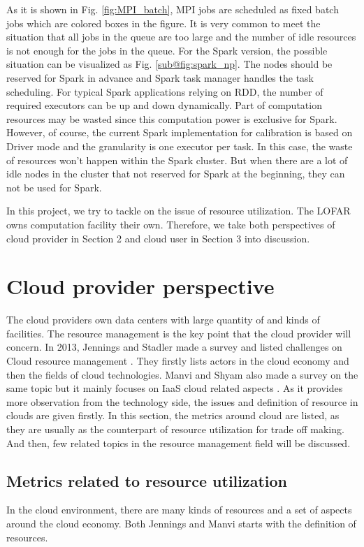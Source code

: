 \documentclass[sigchi]{acmart}
\begin{document}
As it is shown in Fig. \ref{fig:MPI_batch}, MPI jobs are scheduled as fixed batch jobs which are colored boxes in the figure. It is very common to meet the situation that all jobs in the queue are too large and the number of idle resources is not enough for the jobs in the queue. 
For the Spark version, the possible situation can be visualized as Fig. \ref{sub@fig:spark_np}. The nodes should be reserved for Spark in advance and Spark task manager handles the task scheduling. For typical Spark applications relying on RDD, the number of required executors can be up and down dynamically. Part of computation resources may be wasted since this computation power is exclusive for Spark.
However, of course, the current Spark implementation for calibration is based on Driver mode and the granularity is one executor per task. In this case, the waste of resources won't happen within the Spark cluster. But when there are a lot of idle nodes in the cluster that not reserved for Spark at the beginning, they can not be used for Spark. 

In this project, we try to tackle on the issue of resource utilization. The LOFAR owns computation facility their own. Therefore, we take both perspectives of  cloud provider in Section 2 and cloud user in Section 3 into discussion.

\section{Cloud provider perspective}
The cloud providers own data centers with large quantity of and kinds of facilities. 
The resource management is the key point that the cloud provider will concern.
In 2013, Jennings and Stadler made a survey and listed challenges on Cloud resource management \cite{Jennings2015}.
They firstly lists actors in the cloud economy and then the fields of cloud technologies. 
Manvi and Shyam also made a survey on the same topic but it mainly focuses on IaaS cloud related aspects \cite{Manvi2014}. 
As it provides more observation from the technology side, the issues and definition of resource in clouds are given firstly.
In this section, the metrics around cloud are listed, as they are usually as the counterpart of resource utilization for trade off making.
And then, few related topics in the resource management field will be discussed.

\subsection{Metrics related to resource utilization}
In the cloud environment, there are many kinds of resources and a set of aspects around the cloud economy.
Both Jennings \cite{Jennings2015} and Manvi \cite{Manvi2014} starts with the definition of resources.
\end{document}
